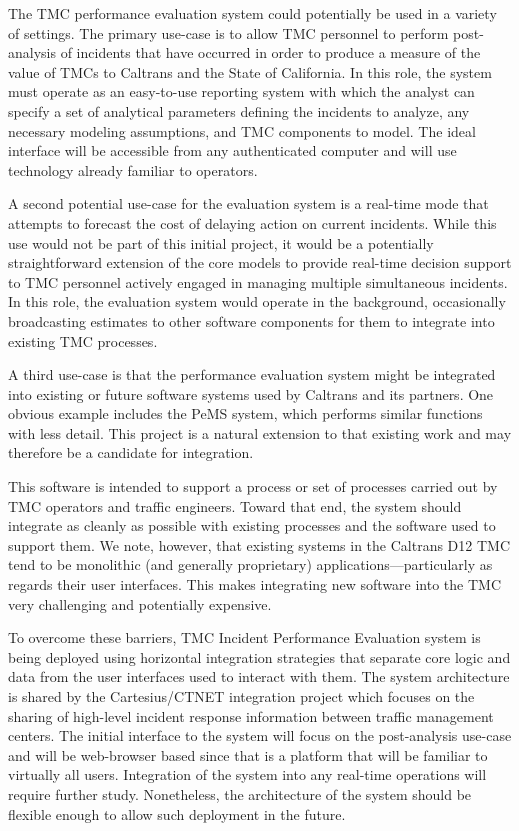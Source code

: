 \documentclass[12pt]{report}
\begin{document}
The TMC performance evaluation system could potentially be used in a
variety of settings. The primary use-case is to allow TMC personnel to
perform post-analysis of incidents that have occurred in order to
produce a measure of the value of TMCs to Caltrans and the State of
California. In this role, the system must operate as an easy-to-use
reporting system with which the analyst can specify a set of
analytical parameters defining the incidents to analyze, any necessary
modeling assumptions, and TMC components to model. The ideal interface
will be accessible from any authenticated computer and will use
technology already familiar to operators.

A second potential use-case for the evaluation system is a real-time
mode that attempts to forecast the cost of delaying action on current
incidents. While this use would not be part of this initial project,
it would be a potentially straightforward extension of the core models
to provide real-time decision support to TMC personnel actively
engaged in managing multiple simultaneous incidents. In this role, the
evaluation system would operate in the background, occasionally
broadcasting estimates to other software components for them to
integrate into existing TMC processes.

A third use-case is that the performance evaluation system might be
integrated into existing or future software systems used by Caltrans
and its partners. One obvious example includes the PeMS system, which
performs similar functions with less detail. This project is a natural
extension to that existing work and may therefore be a candidate for
integration.

This software is intended to support a process or set of processes
carried out by TMC operators and traffic engineers.  Toward that end,
the system should integrate as cleanly as possible with existing
processes and the software used to support them.  We note, however,
that existing systems in the Caltrans D12 TMC tend to be monolithic
(and generally proprietary) applications---particularly as regards
their user interfaces.  This makes integrating new software into the
TMC very challenging and potentially expensive.

To overcome these barriers, TMC Incident Performance Evaluation system
is being deployed using horizontal integration strategies that
separate core logic and data from the user interfaces used to interact
with them.  The system architecture is shared by the Cartesius/CTNET
integration project which focuses on the sharing of high-level
incident response information between traffic management centers.  The
initial interface to the system will focus on the post-analysis
use-case and will be web-browser based since that is a platform that
will be familiar to virtually all users.  Integration of the system
into any real-time operations will require further study.
Nonetheless, the architecture of the system should be flexible enough
to allow such deployment in the future.
\end{document}
